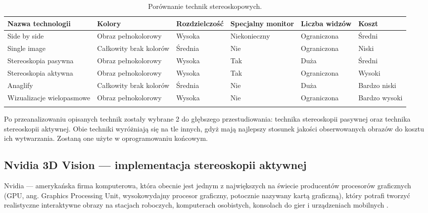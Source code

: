 \begin{table}[H]
\caption{Porównanie technik stereoskopowych.}
\centering
\footnotesize
\label{tab11}
\begin{tabular}{!{\color{sapphire}\vrule width 1pt}m{0.146\textwidth}!{\color{black}\vrule width 1pt}m{0.146\textwidth}!{\color{black}\vrule width 1pt}m{0.146\textwidth}!{\color{black}\vrule width 1pt}m{0.126\textwidth}!{\color{black}\vrule width 1pt}m{0.136\textwidth}!{\color{black}\vrule width 1pt}m{0.126\textwidth}!{\color{sapphire}\vrule width 1pt}}
	\hline
	\Centering\bfseries Nazwa technologii &
	\Centering\bfseries Kolory &
	\Centering\bfseries Rozdzielczość &
	\Centering\bfseries Specjalny monitor &
	\Centering\bfseries Liczba widzów &
	\Centering\bfseries Koszt \\
	\hline
	Side by side & Obraz pełnokolorowy & Wysoka & Niekonieczny & Ograniczona & Średni \\ 
	\hline
	Single image & Całkowity brak kolorów & Średnia & Nie & Ograniczona & Niski \\ 
	\hline
	Stereoskopia pasywna & Obraz pełnokolorowy & Wysoka & Tak & Duża & Średni \\ 
	\hline
	Stereoskopia aktywna & Obraz pełnokolorowy & Wysoka & Tak & Ograniczona & Wysoki \\ 
	\hline
	Anaglify & Całkowity brak kolorów & Średnia & Nie & Duża & Bardzo niski \\ 
	\hline
	Wizualizacje wielopasmowe & Obraz pełnokolorowy & Wysoka & Nie & Ograniczona & Bardzo wysoki \\ 
	\hline
\end{tabular}
\end{table}

Po przeanalizowaniu opisanych technik zostały wybrane 2 do głębszego przestudiowania: technika stereoskopii pasywnej oraz technika stereoskopii aktywnej. Obie techniki wyróżniają się na tle innych, gdyż mają najlepszy stosunek jakości obserwowanych obrazów do kosztu ich wytwarzania. Zostaną one użyte w oprogramowaniu końcowym.


\subsection{Nvidia 3D Vision --- implementacja stereoskopii aktywnej}
Nvidia --- amerykańska firma komputerowa, która obecnie jest jednym z największych na świecie producentów procesorów graficznych (GPU, ang. Graphics Processing Unit, wysokowydajny procesor graficzny, potocznie nazywany kartą graficzną), który potrafi tworzyć realistyczne interaktywne obrazy na stacjach roboczych, komputerach osobistych, konsolach do gier i urządzeniach mobilnych \cite{NvidiaInfo}.

